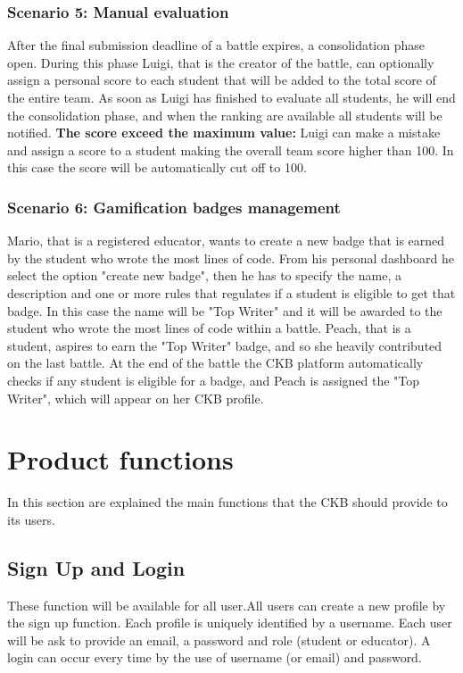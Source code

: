 \subsubsection{Scenario 5: Manual evaluation}
After the final submission deadline of a battle expires, a consolidation phase open. During this phase Luigi, that is the creator of the battle, can optionally assign a personal score to each student that will be added to the total score of the entire team.
As soon as Luigi has finished to evaluate all students, he will end the consolidation phase, and when the ranking are available all students will be notified.\newline
\textbf{The score exceed the maximum value:} Luigi can make a mistake and assign a score to a student making the overall team score higher than 100. In this case the score will be automatically cut off to 100.

\subsubsection{Scenario 6: Gamification badges management}
Mario, that is a registered educator, wants to create a new badge that is earned by the student who wrote the most lines of code. From his personal dashboard he select the option "create new badge", then he has to specify the name, a description and one or more rules that regulates if a student is eligible to get that badge. In this case the name will be "Top Writer" and it will be awarded to the student who wrote the most lines of code within a battle. \newline
Peach, that is a student, aspires to earn the "Top Writer" badge, and so she heavily contributed on the last battle. At the end of the battle the CKB platform automatically checks if any student is eligible for a badge, and Peach is assigned the "Top Writer", which will appear on her CKB profile.

\clearpage

\section{Product functions}\label{desc:prodFunc}
In this section are explained the main functions that the CKB should provide to its users.
\subsection{Sign Up and Login}
These function will be available for all user.\newline All users can create a new profile by the sign up function. Each profile is uniquely identified by a username. Each user will be ask to provide an email, a password and role (student or educator). \newline
A login can occur every time by the use of username (or email) and password.

